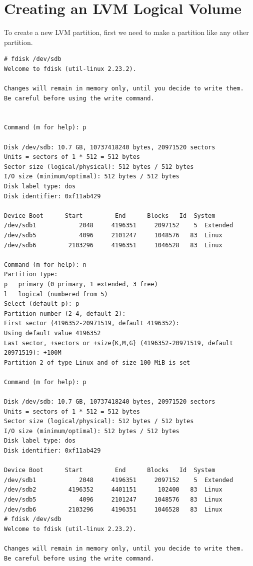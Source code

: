 \section{Creating an LVM Logical Volume}

To create a new LVM partition, first we need to make a partition like any other partition. 

\vspace{-15pt}
\begin{verbatim}
# fdisk /dev/sdb
Welcome to fdisk (util-linux 2.23.2).

Changes will remain in memory only, until you decide to write them.
Be careful before using the write command.


Command (m for help): p

Disk /dev/sdb: 10.7 GB, 10737418240 bytes, 20971520 sectors
Units = sectors of 1 * 512 = 512 bytes
Sector size (logical/physical): 512 bytes / 512 bytes
I/O size (minimum/optimal): 512 bytes / 512 bytes
Disk label type: dos
Disk identifier: 0xf11ab429

Device Boot      Start         End      Blocks   Id  System
/dev/sdb1            2048     4196351     2097152    5  Extended
/dev/sdb5            4096     2101247     1048576   83  Linux
/dev/sdb6         2103296     4196351     1046528   83  Linux

Command (m for help): n
Partition type:
p   primary (0 primary, 1 extended, 3 free)
l   logical (numbered from 5)
Select (default p): p
Partition number (2-4, default 2): 
First sector (4196352-20971519, default 4196352): 
Using default value 4196352
Last sector, +sectors or +size{K,M,G} (4196352-20971519, default 20971519): +100M 
Partition 2 of type Linux and of size 100 MiB is set

Command (m for help): p

Disk /dev/sdb: 10.7 GB, 10737418240 bytes, 20971520 sectors
Units = sectors of 1 * 512 = 512 bytes
Sector size (logical/physical): 512 bytes / 512 bytes
I/O size (minimum/optimal): 512 bytes / 512 bytes
Disk label type: dos
Disk identifier: 0xf11ab429

Device Boot      Start         End      Blocks   Id  System
/dev/sdb1            2048     4196351     2097152    5  Extended
/dev/sdb2         4196352     4401151      102400   83  Linux
/dev/sdb5            4096     2101247     1048576   83  Linux
/dev/sdb6         2103296     4196351     1046528   83  Linux
# fdisk /dev/sdb
Welcome to fdisk (util-linux 2.23.2).

Changes will remain in memory only, until you decide to write them.
Be careful before using the write command.



\end{verbatim}
